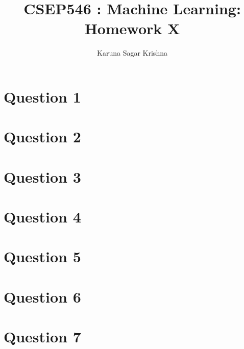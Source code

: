 \documentclass{article}
\title{CSEP546 : Machine Learning: Homework X}
\author{Karuna Sagar Krishna}
\begin{document}
    \maketitle

    \section*{Question 1}
    \section*{Question 2}
    \section*{Question 3}
    \section*{Question 4}
    \section*{Question 5}
    \section*{Question 6}
    \section*{Question 7}
\end{document}
